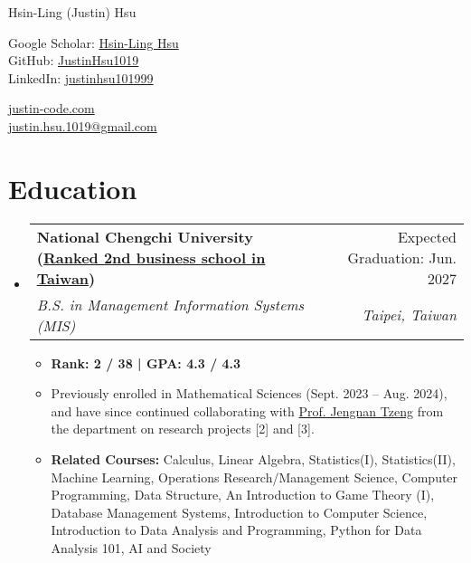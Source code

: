 \documentclass[letterpaper,10pt]{article}
\makeatletter
\newcommand{\resumeItem}[1]{
  \item\small{
    {#1 \vspace{-2pt}}
  }
}
\newcommand{\resumeSubheading}[4]{
  \vspace{-2pt}\item
    \begin{tabular*}{0.97\textwidth}[t]{l@{\extracolsep{\fill}}r}
      \textbf{#1} & #2 \\
      \textit{\small#3} & \textit{\small #4} \\
    \end{tabular*}\vspace{-7pt}
}
\newcommand{\resumeSubHeadingListStart}{\begin{itemize}[leftmargin=0.15in, label={}]}
\newcommand{\resumeSubHeadingListEnd}{\end{itemize}}
\newcommand{\resumeItemListStart}{\begin{itemize}}
\newcommand{\resumeItemListEnd}{\end{itemize}\vspace{-5pt}}
\makeatother
\begin{document}
\begin{center}
    {\LARGE Hsin-Ling (Justin) Hsu} \\ \vspace{2pt}
    \begin{multicols}{2}
    \begin{flushleft}
    Google Scholar: \href{{https://scholar.google.com/citations?user=pCXJM5AAAAAJ}}{Hsin-Ling Hsu} \\ \vspace{1pt}
    GitHub: \href{{https://github.com/justinHsu1019}}{JustinHsu1019}\\ \vspace{1pt}
    LinkedIn: \href{{https://www.linkedin.com/in/justinhsu101999}}{justinhsu101999}
    \end{flushleft}
    \begin{flushright}
    \href{{https://justin-code.com}}{justin-code.com}\\ \vspace{5pt}
    \href{mailto:justin.hsu.1019@gmail.com}{justin.hsu.1019@gmail.com}
    \end{flushright}
    \end{multicols}
\end{center}

\vspace{-2pt}
\section{Education}
  \resumeSubHeadingListStart
      \resumeSubheading
      {National Chengchi University \normalfont(\href{https://www.eduniversal-ranking.com/business-school-university-ranking-in-taiwan-region-china.html}{Ranked 2nd business school in Taiwan})}{Expected Graduation: Jun. 2027}
      {B.S. in Management Information Systems (MIS)}{Taipei, Taiwan}
      \resumeItemListStart
      \vspace{0.3em}
        \resumeItem{\textbf{Rank: 2 / 38 | GPA: 4.3 / 4.3}}
        \resumeItem{Previously enrolled in Mathematical Sciences (Sept. 2023 -- Aug. 2024), and have since continued collaborating with \href{https://ms.nccu.edu.tw/PageStaffing/Detail?fid=4666\&id=1118}{Prof. Jengnan Tzeng} from the department on research projects [2] and [3].}
        \resumeItem{\textbf{Related Courses:} Calculus, Linear Algebra, Statistics(I), Statistics(II), Machine Learning, Operations Research/Management Science, Computer Programming, Data Structure, An Introduction to Game Theory (I), Database Management Systems, Introduction to Computer Science, Introduction to Data Analysis and Programming, Python for Data Analysis 101, AI and Society}
      \resumeItemListEnd
  \resumeSubHeadingListEnd
\end{document}
